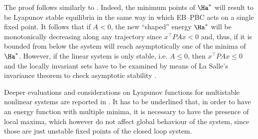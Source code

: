 %
%
\pf
The proof follows similarly to \cite{ortega2008control}. Indeed, the minimum points of $\Ha^*$ will result to be Lyapunov stable equilibria in the same way in which EB--PBC acts on a single fixed point. It follows that if $A<0$, the new ``shaped'' energy $\Ha^*$ will be monotonically decreasing along any trajectory since $x^\top PAx<0$ and, thus, if it is bounded from below the system will reach asymptotically one of the minima of $\Ha^*$. However, if the linear system is only stable, i.e. $A\leq 0$, then $x^\top PAx\leq0$ and the locally invariant sets have to be examined by means of La Salle’s invariance theorem to check asymptotic stability \citep{khalil2002nonlinear}.
\endpf
%
\begin{rem}
	Deeper evaluations and considerations on Lyapunov functions for multistable nonlinear systems are reported in \cite{efimov2012global}. It has to be underlined that, in order to have an energy function with multiple minima, it is necessary to have the presence of local maxima, which however do not affect global behaviour of the system, since those are just unstable fixed points of the closed loop system.
	
\end{rem}
